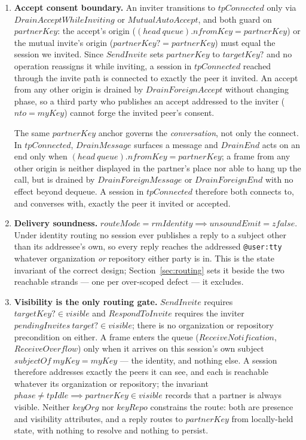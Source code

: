 \documentclass[a4paper,10pt,fleqn]{article}
\begin{document}
\begin{enumerate}
\item \textbf{Accept consent boundary.}  An inviter transitions to
  $tpConnected$ only via $DrainAcceptWhileInviting$ or
  $MutualAutoAccept$, and both guard on $partnerKey$: the accept's
  origin ($(head~queue).nfromKey = partnerKey$) or the mutual invite's
  origin ($partnerKey? = partnerKey$) must equal the session we
  invited.  Since $SendInvite$ sets $partnerKey$ to $targetKey?$ and no
  operation reassigns it while inviting, a session in $tpConnected$
  reached through the invite path is connected to exactly the peer it
  invited.  An accept from any other origin is drained by
  $DrainForeignAccept$ without changing phase, so a third party who
  publishes an accept addressed to the inviter ($nto = myKey$) cannot
  forge the invited peer's consent.

  The same $partnerKey$ anchor governs the \emph{conversation}, not
  only the connect.  In $tpConnected$, $DrainMessage$ surfaces a
  message and $DrainEnd$ acts on an end only when
  $(head~queue).nfromKey = partnerKey$; a frame from any other origin
  is neither displayed in the partner's place nor able to hang up the
  call, but is drained by $DrainForeignMessage$ or $DrainForeignEnd$
  with no effect beyond dequeue.  A session in $tpConnected$ therefore
  both connects to, and converses with, exactly the peer it invited or
  accepted.

\item \textbf{Delivery soundness.}  $routeMode = rmIdentity \implies
  unsoundEmit = zfalse$.  Under identity routing no session ever
  publishes a reply to a subject other than its addressee's own, so
  every reply reaches the addressed \texttt{@user:tty} whatever
  organization \emph{or} repository either party is in.  This is the
  state invariant of the correct design; Section~\ref{sec:routing} sets
  it beside the two reachable strands --- one per over-scoped defect ---
  it excludes.

\item \textbf{Visibility is the only routing gate.}  $SendInvite$
  requires $targetKey? \in visible$ and $RespondToInvite$ requires the
  inviter $pendingInvites~target? \in visible$; there is no organization
  or repository precondition on either.  A frame enters the queue
  ($ReceiveNotification$, $ReceiveOverflow$) only when it arrives on this
  session's own subject $subjectOf~myKey = myKey$ --- the identity, and
  nothing else.  A session therefore addresses exactly the peers it can
  see, and each is reachable whatever its organization or repository; the
  invariant $phase \neq tpIdle \implies partnerKey \in visible$ records
  that a partner is always visible.  Neither $keyOrg$ nor $keyRepo$
  constrains the route: both are presence and visibility attributes, and
  a reply routes to $partnerKey$ from locally-held state, with nothing to
  resolve and nothing to persist.
\end{enumerate}
\end{document}
